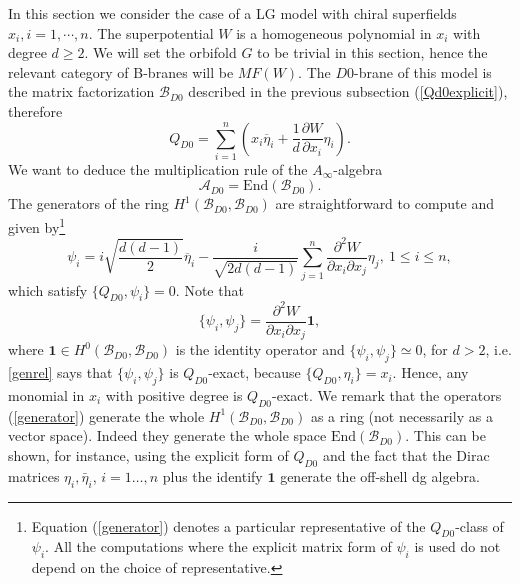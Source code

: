 \documentclass[a4paper,11pt]{article}
\def\cA{\mathcal{A}}
\newcommand{\Af}{{A_\infty}}
\numberwithin{equation}{section}
\begin{document}
In this section we consider the case of a LG model with chiral superfields 
$x_i, i=1,\cdots,n$. The superpotential $W$ is a homogeneous polynomial in 
$x_i$ 
with degree $d \geq 2$. We will set the orbifold $G$ to be trivial in this 
section, hence the relevant category of B-branes will be $MF(W)$. The 
$D0$-brane of this model is the matrix factorization $\mathcal{B}_{D0}$ 
described in the previous subsection (\ref{Qd0explicit}), therefore
\begin{equation}\label{D0}
Q_{D0} = \sum_{i=1}^n \left( x_i \overline{\eta}_i + \frac{1}{d} \frac{\partial 
W}{\partial x_i} \eta_i \right).
\end{equation}
We want to deduce the multiplication rule of the $\Af$-algebra 
\begin{equation}
\cA_{D0}=\mathrm{End}(\mathcal{B}_{D0}).
\end{equation}
The generators of the ring $H^{1}(\mathcal{B}_{D0},\mathcal{B}_{D0})$ are 
straightforward to compute and given by\footnote{Equation (\ref{generator}) 
denotes a particular representative of the $Q_{D0}$-class of $\psi_{i}$. All 
the computations where the explicit matrix form of $\psi_{i}$ is used do not 
depend on the choice of representative.}
\begin{equation}\label{generator}
\psi_i = i\sqrt{\frac{d(d-1)}{2}}\overline{\eta}_i - \frac{i}{\sqrt{2d (d-1)}} 
\sum_{j=1}^n \frac{\partial^2 W}{\partial x_i \partial x_j} \eta_j,~1 \leq i 
\leq n,
\end{equation}
which satisfy $\{ Q_{D0}, \psi_i \} = 0$. Note that
\begin{equation}\label{genrel}
\{ \psi_i,\psi_j \} = \frac{\partial^2 W}{\partial x_i \partial 
x_j}\mathbf{1},
\end{equation}
where $\mathbf{1}\in H^{0}(\mathcal{B}_{D0},\mathcal{B}_{D0})$ is the 
identity operator and $\{ \psi_i,\psi_j \}\simeq 0$, for $d>2$, i.e.
\eqref{genrel} says that $\{ 
\psi_i,\psi_j \}$ is $Q_{D0}$-exact, because $\{Q_{D0},\eta_i\} = x_i$. 
Hence, any monomial in $x_i$ with positive degree is $Q_{D0}$-exact. We remark 
that the operators (\ref{generator}) generate the whole
$H^{1}(\mathcal{B}_{D0},\mathcal{B}_{D0})$ as a ring (not necessarily as a 
vector space). Indeed they generate the whole space 
$\mathrm{End}(\mathcal{B}_{D0})$. This can be shown, for instance, 
using the explicit form of $Q_{D0}$ and the fact that the Dirac matrices 
$\eta_{i},\bar{\eta}_{i}$, $i=1\ldots,n$ plus the identify $\mathbf{1}$ generate 
the off-shell dg algebra.
\end{document}
